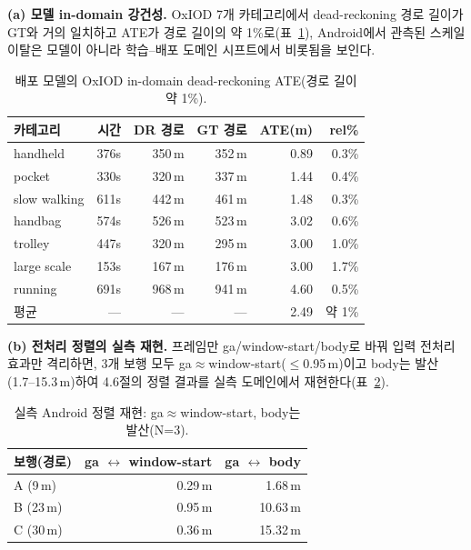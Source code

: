 \documentclass[10pt,twocolumn,a4paper]{article}
\begin{document}
\noindent\textbf{(a) 모델 in-domain 강건성.} OxIOD 7개 카테고리에서 dead-reckoning 경로 길이가 GT와 거의 일치하고 ATE가 경로 길이의 약 1\%로(표~\ref{tab:android-indomain}), Android에서 관측된 스케일 이탈은 모델이 아니라 학습--배포 도메인 시프트에서 비롯됨을 보인다.

\begin{table}[t]
\caption{배포 모델의 OxIOD in-domain dead-reckoning ATE(경로 길이 약 1\%).}
\label{tab:android-indomain}
\centering\footnotesize
\begin{tabular}{@{}lrrrrr@{}}
\toprule
카테고리 & 시간 & DR 경로 & GT 경로 & ATE(m) & rel\% \\ \midrule
handheld & 376s & 350\,m & 352\,m & 0.89 & 0.3\% \\
pocket & 330s & 320\,m & 337\,m & 1.44 & 0.4\% \\
slow walking & 611s & 442\,m & 461\,m & 1.48 & 0.3\% \\
handbag & 574s & 526\,m & 523\,m & 3.02 & 0.6\% \\
trolley & 447s & 320\,m & 295\,m & 3.00 & 1.0\% \\
large scale & 153s & 167\,m & 176\,m & 3.00 & 1.7\% \\
running & 691s & 968\,m & 941\,m & 4.60 & 0.5\% \\ \midrule
평균 & --- & --- & --- & 2.49 & 약 1\% \\ \bottomrule
\end{tabular}
\end{table}

\noindent\textbf{(b) 전처리 정렬의 실측 재현.} 프레임만 ga/window-start/body로 바꿔 입력 전처리 효과만 격리하면, 3개 보행 모두 ga$\approx$window-start($\le$0.95\,m)이고 body는 발산(1.7--15.3\,m)하여 4.6절의 정렬 결과를 실측 도메인에서 재현한다(표~\ref{tab:android-align}).

\begin{table}[t]
\caption{실측 Android 정렬 재현: ga$\approx$window-start, body는 발산(N=3).}
\label{tab:android-align}
\centering\footnotesize
\begin{tabular}{@{}lrr@{}}
\toprule
보행(경로) & ga $\leftrightarrow$ window-start & ga $\leftrightarrow$ body \\ \midrule
A (9\,m) & 0.29\,m & 1.68\,m \\
B (23\,m) & 0.95\,m & 10.63\,m \\
C (30\,m) & 0.36\,m & 15.32\,m \\ \bottomrule
\end{tabular}
\end{table}
\end{document}

